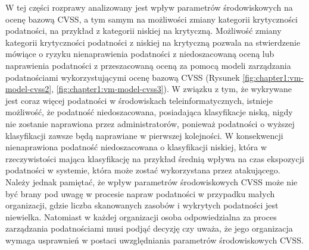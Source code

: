 W tej części rozprawy analizowany jest wpływ parametrów środowiskowych na ocenę bazową CVSS, a tym samym na możliwości zmiany kategorii krytyczności podatności, na przykład z kategorii niskiej na krytyczną. Możliwość zmiany kategorii krytyczności podatności z niskiej na krytyczną pozwala na stwierdzenie mówiące o ryzyku nienaprawienia podatności z niedoszacowaną oceną lub naprawienia podatności z przeszacowaną oceną za pomocą modeli zarządzania podatnościami wykorzystującymi ocenę bazową CVSS (Rysunek \ref{fig:chapter1:vm-model-cvss2}, \ref{fig:chapter1:vm-model-cvss3}). W związku z tym, że wykrywane jest coraz więcej podatności w środowiskach teleinformatycznych, istnieje możliwość, że podatność niedoszacowana, posiadająca klasyfikacje niską, nigdy nie zostanie naprawiona przez administratorów, ponieważ podatności o wyższej klasyfikacji zawsze będą naprawiane w pierwszej kolejności. W konsekwencji nienaprawiona podatność niedoszacowana o klasyfikacji niskiej, która w rzeczywistości mająca klasyfikację na przykład średnią wpływa na czas ekspozycji podatności w systemie, która może zostać wykorzystana przez atakującego. Należy jednak pamiętać, że wpływ parametrów środowiskowych CVSS może nie być brany pod uwagę w procesie napraw podatności w przypadku małych organizacji, gdzie liczba skanowanych zasobów i wykrytych podatności jest niewielka. Natomiast w każdej organizacji osoba odpowiedzialna za proces zarządzania podatnościami musi podjąć decyzję czy uważa, że jego organizacja wymaga usprawnień w postaci uwzględniania parametrów środowiskowych CVSS.

